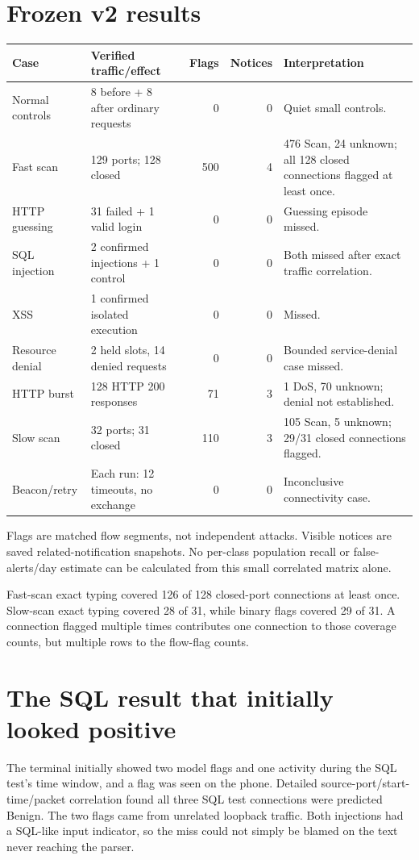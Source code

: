 \documentclass[11pt,a4paper,oneside]{report}
\begin{document}
\section{Frozen v2 results}
\begin{longtable}{p{}p{}r r p{}}
\toprule Case & Verified traffic/effect & Flags & Notices & Interpretation\\\midrule\endhead
Normal controls & 8 before + 8 after ordinary requests & 0 & 0 & Quiet small controls.\\
Fast scan & 129 ports; 128 closed & 500 & 4 & 476 Scan, 24 unknown; all 128 closed connections flagged at least once.\\
HTTP guessing & 31 failed + 1 valid login & 0 & 0 & Guessing episode missed.\\
SQL injection & 2 confirmed injections + 1 control & 0 & 0 & Both missed after exact traffic correlation.\\
XSS & 1 confirmed isolated execution & 0 & 0 & Missed.\\
Resource denial & 2 held slots, 14 denied requests & 0 & 0 & Bounded service-denial case missed.\\
HTTP burst & 128 HTTP 200 responses & 71 & 3 & 1 DoS, 70 unknown; denial not established.\\
Slow scan & 32 ports; 31 closed & 110 & 3 & 105 Scan, 5 unknown; 29/31 closed connections flagged.\\
Beacon/retry & Each run: 12 timeouts, no exchange & 0 & 0 & Inconclusive connectivity case.\\
\bottomrule
\end{longtable}
Flags are matched flow segments, not independent attacks. Visible notices are saved related-notification snapshots. No per-class population recall or false-alerts/day estimate can be calculated from this small correlated matrix alone.

Fast-scan exact typing covered 126 of 128 closed-port connections at least once. Slow-scan exact typing covered 28 of 31, while binary flags covered 29 of 31. A connection flagged multiple times contributes one connection to those coverage counts, but multiple rows to the flow-flag counts.

\section{The SQL result that initially looked positive}
The terminal initially showed two model flags and one activity during the SQL test's time window, and a flag was seen on the phone. Detailed source-port/start-time/packet correlation found all three SQL test connections were predicted Benign. The two flags came from unrelated loopback traffic. Both injections had a SQL-like input indicator, so the miss could not simply be blamed on the text never reaching the parser.
\end{document}
